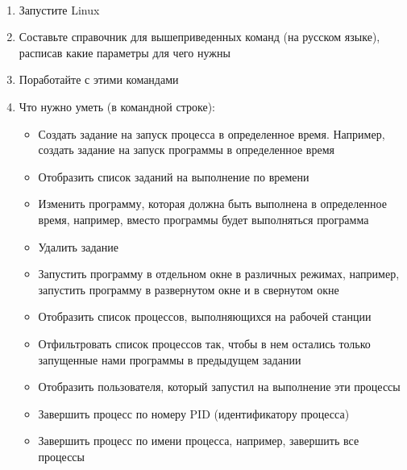 \documentclass[a4paper,12pt]{article}
\begin{document}
  \begin{flushleft}
     \\[0.5em]
    \begin{enumerate}
      \item Запустите Linux
      \item Составьте справочник для вышеприведенных команд (на русском языке), расписав какие параметры для чего нужны
      \item Поработайте с этими командами
      \item Что нужно уметь (в командной строке):
      \begin{itemize}
        \item Создать задание на запуск процесса в определенное время. Например, создать задание на запуск программы  в определенное время
        \item Отобразить список заданий на выполнение по времени
        \item Изменить программу, которая должна быть выполнена в определенное время, например, вместо программы  будет выполняться программа 
        \item Удалить задание
        \item Запустить программу в отдельном окне в различных режимах, например, запустить программу  в развернутом окне и в свернутом окне
        \item Отобразить список процессов, выполняющихся на рабочей станции
        \item Отфильтровать список процессов так, чтобы в нем остались только запущенные нами программы  в предыдущем задании
        \item Отобразить пользователя, который запустил на выполнение эти процессы
        \item Завершить процесс по номеру PID (идентификатору процесса)
        \item Завершить процесс по имени процесса, например, завершить все процессы 
      \end{itemize}
    \end{enumerate}
  \end{flushleft}
\end{document}
